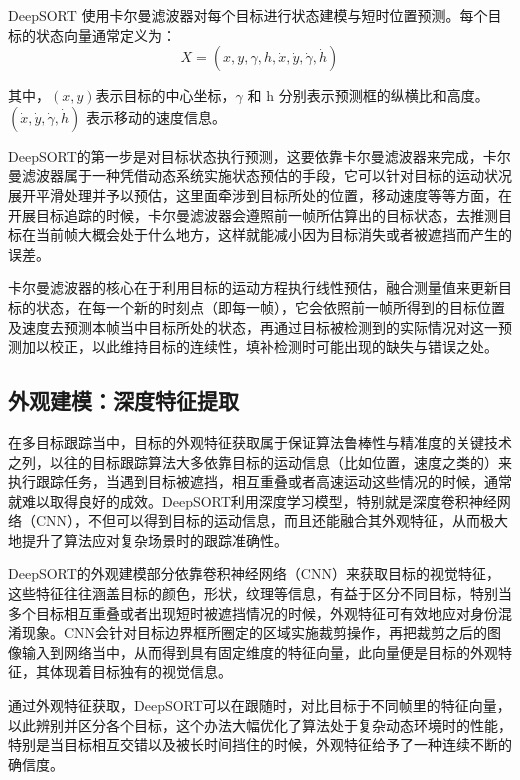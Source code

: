 DeepSORT 使用卡尔曼滤波器对每个目标进行状态建模与短时位置预测。每个目标的状态向量通常定义为：
\begin{equation}
	X = (x, y, \gamma, h, \dot{x}, \dot{y}, \dot{\gamma}, \dot{h})
\end{equation}

其中，\((x, y)\)表示目标的中心坐标，\(\gamma\) 和 h 分别表示预测框的纵横比和高度。\((\dot{x}, \dot{y}, \dot{\gamma}, \dot{h})\) 表示移动的速度信息。

DeepSORT的第一步是对目标状态执行预测，这要依靠卡尔曼滤波器来完成，卡尔曼滤波器属于一种凭借动态系统实施状态预估的手段，它可以针对目标的运动状况展开平滑处理并予以预估，这里面牵涉到目标所处的位置，移动速度等等方面，在开展目标追踪的时候，卡尔曼滤波器会遵照前一帧所估算出的目标状态，去推测目标在当前帧大概会处于什么地方，这样就能减小因为目标消失或者被遮挡而产生的误差。

卡尔曼滤波器的核心在于利用目标的运动方程执行线性预估，融合测量值来更新目标的状态，在每一个新的时刻点（即每一帧），它会依照前一帧所得到的目标位置及速度去预测本帧当中目标所处的状态，再通过目标被检测到的实际情况对这一预测加以校正，以此维持目标的连续性，填补检测时可能出现的缺失与错误之处。


\subsection{外观建模：深度特征提取}

在多目标跟踪当中，目标的外观特征获取属于保证算法鲁棒性与精准度的关键技术之列，以往的目标跟踪算法大多依靠目标的运动信息（比如位置，速度之类的）来执行跟踪任务，当遇到目标被遮挡，相互重叠或者高速运动这些情况的时候，通常就难以取得良好的成效。DeepSORT利用深度学习模型，特别就是深度卷积神经网络（CNN），不但可以得到目标的运动信息，而且还能融合其外观特征，从而极大地提升了算法应对复杂场景时的跟踪准确性。

DeepSORT的外观建模部分依靠卷积神经网络（CNN）来获取目标的视觉特征，这些特征往往涵盖目标的颜色，形状，纹理等信息，有益于区分不同目标，特别当多个目标相互重叠或者出现短时被遮挡情况的时候，外观特征可有效地应对身份混淆现象。CNN会针对目标边界框所圈定的区域实施裁剪操作，再把裁剪之后的图像输入到网络当中，从而得到具有固定维度的特征向量，此向量便是目标的外观特征，其体现着目标独有的视觉信息。

通过外观特征获取，DeepSORT可以在跟随时，对比目标于不同帧里的特征向量，以此辨别并区分各个目标，这个办法大幅优化了算法处于复杂动态环境时的性能，特别是当目标相互交错以及被长时间挡住的时候，外观特征给予了一种连续不断的确信度。


